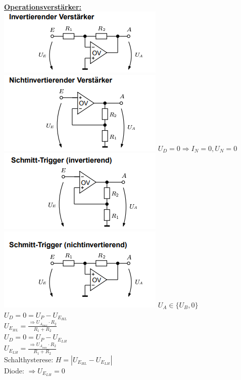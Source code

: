 \documentclass[11pt]{article}
\begin{document}
~~~~~~
\begin{minipage}{0.3\textwidth}
\underline{\textbf{Operationsverstärker:}}\\
\includegraphics[scale=0.40]{IOV.png}
\includegraphics[scale=0.40]{NIOV.png}
$U_D = 0 \Rightarrow I_N = 0, U_N = 0$
\includegraphics[scale=0.40]{ISTOV.png}
\includegraphics[scale=0.40]{NISTOV.png}
$U_A \in \{U_B,0\}$
$U_D = 0 = U_P - U_{E_{HL}}$\\
\phantom{sssi}$U_{E_{HL}} = \frac{\Rightarrow U_{A_{max}} \cdot R_2}{R_1 + R_2}$\\
$U_D = 0 = U_P - U_{E_{LH}}$\\
\phantom{sssi}$U_{E_{LH}}= \frac{\Rightarrow U_{A_{min}} \cdot R_2}{R_1 + R_2}$\\
Schalthysterese: $H = |U_{E_{HL}} - U_{E_{LH}}| $\\
Diode: $\Rightarrow U_{E_{LH}} = 0$


\end{minipage}
\end{document}
